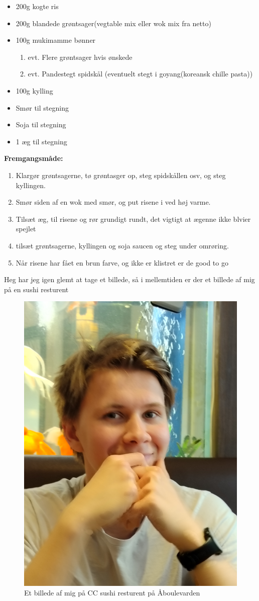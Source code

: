 \documentclass{book}
\begin{document}
\begin{minipage}[t]{0.5\textwidth}
\begin{itemize}
    \item 200g kogte ris
    \item 200g blandede grøntsager(vegtable mix eller wok mix fra netto)
    \item 100g mukimamme bønner
     \begin{enumerate}
        \item evt. Flere grøntsager hvis ønskede
        \item evt. Pandestegt spidskål (eventuelt stegt i goyang(koreansk chille pasta))
    \end{enumerate}
    \item 100g kylling
    \item Smør til stegning
    \item Soja til stegning
    \item 1 æg til stegning
\end{itemize}
\end{minipage}
\begin{minipage}[t]{0.5\textwidth}
\textbf{Fremgangsmåde:}
\begin{enumerate}
    \item Klargør grøntsagerne, tø grøntasger op, steg spidskållen osv, og steg kyllingen.
    \item Smør siden af en wok med smør, og put risene i ved høj varme.
    \item Tilsæt æg, til risene og rør grundigt rundt, det vigtigt at ægenne ikke blvier spejlet
    \item tilsæt grøntsagerne, kyllingen og soja saucen og steg under omrøring.
    \item Når risene har fået en brun farve, og ikke er klistret er de good to go
\end{enumerate}
\end{minipage}
\newpage   Heg har jeg igen glemt at tage et billede, så i mellemtiden er der et billede af mig på en sushi resturent \begin{figure}
    \centering
    \includegraphics[width=0.5\linewidth]{Sushi_spisning.jpg}
    \caption{Et billede af mig på CC sushi resturent på Åboulevarden}
\end{figure}
\end{document}
